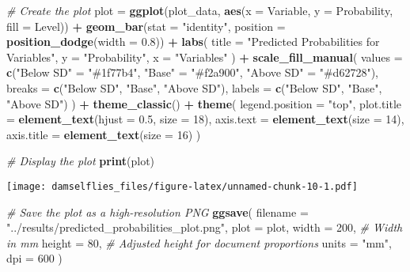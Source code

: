 \documentclass[
]{article}
\newenvironment{Shaded}{\begin{snugshade}}{\end{snugshade}}
\newcommand{\AttributeTok}[1]{\textcolor[rgb]{0.13,0.29,0.53}{#1}}
\newcommand{\CommentTok}[1]{\textcolor[rgb]{0.56,0.35,0.01}{\textit{#1}}}
\newcommand{\DecValTok}[1]{\textcolor[rgb]{0.00,0.00,0.81}{#1}}
\newcommand{\FloatTok}[1]{\textcolor[rgb]{0.00,0.00,0.81}{#1}}
\newcommand{\FunctionTok}[1]{\textcolor[rgb]{0.13,0.29,0.53}{\textbf{#1}}}
\newcommand{\NormalTok}[1]{#1}
\newcommand{\OtherTok}[1]{\textcolor[rgb]{0.56,0.35,0.01}{#1}}
\newcommand{\SpecialCharTok}[1]{\textcolor[rgb]{0.81,0.36,0.00}{\textbf{#1}}}
\newcommand{\StringTok}[1]{\textcolor[rgb]{0.31,0.60,0.02}{#1}}
\begin{document}
\begin{Shaded}
\begin{Highlighting}[]
\CommentTok{\# Create the plot}
\NormalTok{plot }\OtherTok{=} \FunctionTok{ggplot}\NormalTok{(plot\_data, }\FunctionTok{aes}\NormalTok{(}\AttributeTok{x =}\NormalTok{ Variable, }\AttributeTok{y =}\NormalTok{ Probability, }\AttributeTok{fill =}\NormalTok{ Level)) }\SpecialCharTok{+}
  \FunctionTok{geom\_bar}\NormalTok{(}\AttributeTok{stat =} \StringTok{"identity"}\NormalTok{, }\AttributeTok{position =} \FunctionTok{position\_dodge}\NormalTok{(}\AttributeTok{width =} \FloatTok{0.8}\NormalTok{)) }\SpecialCharTok{+}
  \FunctionTok{labs}\NormalTok{(}
    \AttributeTok{title =} \StringTok{"Predicted Probabilities for Variables"}\NormalTok{,}
    \AttributeTok{y =} \StringTok{"Probability"}\NormalTok{,}
    \AttributeTok{x =} \StringTok{"Variables"}
\NormalTok{  ) }\SpecialCharTok{+}
  \FunctionTok{scale\_fill\_manual}\NormalTok{(}
    \AttributeTok{values =} \FunctionTok{c}\NormalTok{(}\StringTok{"Below SD"} \OtherTok{=} \StringTok{"\#1f77b4"}\NormalTok{, }\StringTok{"Base"} \OtherTok{=} \StringTok{"\#f2a900"}\NormalTok{, }\StringTok{"Above SD"} \OtherTok{=} \StringTok{"\#d62728"}\NormalTok{),}
    \AttributeTok{breaks =} \FunctionTok{c}\NormalTok{(}\StringTok{"Below SD"}\NormalTok{, }\StringTok{"Base"}\NormalTok{, }\StringTok{"Above SD"}\NormalTok{),}
    \AttributeTok{labels =} \FunctionTok{c}\NormalTok{(}\StringTok{"Below SD"}\NormalTok{, }\StringTok{"Base"}\NormalTok{, }\StringTok{"Above SD"}\NormalTok{)}
\NormalTok{  ) }\SpecialCharTok{+}
  \FunctionTok{theme\_classic}\NormalTok{() }\SpecialCharTok{+}
  \FunctionTok{theme}\NormalTok{(}
    \AttributeTok{legend.position =} \StringTok{"top"}\NormalTok{,}
    \AttributeTok{plot.title =} \FunctionTok{element\_text}\NormalTok{(}\AttributeTok{hjust =} \FloatTok{0.5}\NormalTok{, }\AttributeTok{size =} \DecValTok{18}\NormalTok{),}
    \AttributeTok{axis.text =} \FunctionTok{element\_text}\NormalTok{(}\AttributeTok{size =} \DecValTok{14}\NormalTok{),}
    \AttributeTok{axis.title =} \FunctionTok{element\_text}\NormalTok{(}\AttributeTok{size =} \DecValTok{16}\NormalTok{)}
\NormalTok{  )}

\CommentTok{\# Display the plot}
\FunctionTok{print}\NormalTok{(plot)}
\end{Highlighting}
\end{Shaded}

\texttt{[image: damselflies\_files/figure-latex/unnamed-chunk-10-1.pdf]}

\begin{Shaded}
\begin{Highlighting}[]
\CommentTok{\# Save the plot as a high{-}resolution PNG}
\FunctionTok{ggsave}\NormalTok{(}
  \AttributeTok{filename =} \StringTok{"../results/predicted\_probabilities\_plot.png"}\NormalTok{, }
  \AttributeTok{plot =}\NormalTok{ plot, }
  \AttributeTok{width =} \DecValTok{200}\NormalTok{,  }\CommentTok{\# Width in mm}
  \AttributeTok{height =} \DecValTok{80}\NormalTok{,  }\CommentTok{\# Adjusted height for document proportions}
  \AttributeTok{units =} \StringTok{"mm"}\NormalTok{,}
  \AttributeTok{dpi =} \DecValTok{600}
\NormalTok{)}
\end{Highlighting}
\end{Shaded}
\end{document}
